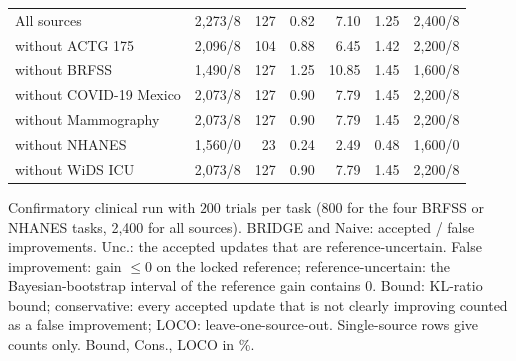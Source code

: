 \begin{table}[!htb]
\begin{tabular}{@{}lrrrrrr@{}}
All sources & 2,273/8 & 127 & 0.82 & 7.10 & 1.25 & 2,400/8 \\
without ACTG 175 & 2,096/8 & 104 & 0.88 & 6.45 & 1.42 & 2,200/8 \\
without BRFSS & 1,490/8 & 127 & 1.25 & 10.85 & 1.45 & 1,600/8 \\
without COVID-19 Mexico & 2,073/8 & 127 & 0.90 & 7.79 & 1.45 & 2,200/8 \\
without Mammography & 2,073/8 & 127 & 0.90 & 7.79 & 1.45 & 2,200/8 \\
without NHANES & 1,560/0 & 23 & 0.24 & 2.49 & 0.48 & 1,600/0 \\
without WiDS ICU & 2,073/8 & 127 & 0.90 & 7.79 & 1.45 & 2,200/8 \\
\bottomrule
\end{tabular}

\vspace{2pt}
\parbox{\linewidth}{\justifying\scriptsize *Confirmatory clinical run with $200$ trials per task (800 for the four BRFSS or NHANES tasks, 2,400 for all sources). BRIDGE and Naive: accepted / false improvements. Unc.: the accepted updates that are reference-uncertain. False improvement: gain $\le 0$ on the locked reference; reference-uncertain: the Bayesian-bootstrap interval of the reference gain contains $0$. Bound: KL-ratio bound; conservative: every accepted update that is not clearly improving counted as a false improvement; LOCO: leave-one-source-out. Single-source rows give counts only. Bound, Cons., LOCO in \%.}
\end{table}
